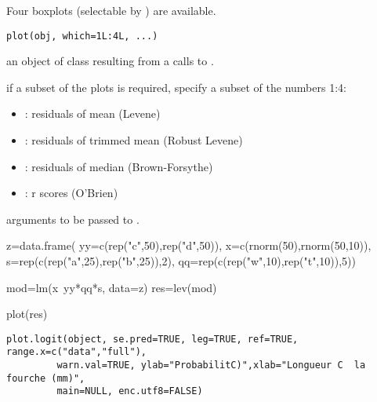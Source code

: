 \documentclass[a4paper]{book}
\begin{document}
\newpage
{}
%
\begin{Description}\relax
Four boxplots (selectable by ) are available.
\end{Description}
%
\begin{Usage}
\begin{verbatim}
plot(obj, which=1L:4L, ...)
\end{verbatim}
\end{Usage}
%
\begin{Arguments}
\begin{ldescription}
\item[\code{obj}] an object of class  resulting from a calls to .

\item[\code{which}] if a subset of the plots is required, specify a subset of the numbers 1:4:
\begin{itemize}

\item {} : residuals of mean (Levene)
\item {} : residuals of trimmed mean (Robust Levene)
\item {} : residuals of median (Brown-Forsythe)
\item {} : r scores (O'Brien)

\end{itemize}


\item[\code{...}] arguments to be passed to .

\end{ldescription}
\end{Arguments}
%
\begin{Examples}
\begin{ExampleCode}
z=data.frame( yy=c(rep("c",50),rep("d",50)),
        x=c(rnorm(50),rnorm(50,10)),
        s=rep(c(rep("a",25),rep("b",25)),2),
        qq=rep(c(rep("w",10),rep("t",10)),5))

mod=lm(x~yy*qq*s, data=z)
res=lev(mod)

plot(res)
\end{ExampleCode}
\end{Examples}
\newpage
{}
%
\begin{Usage}
\begin{verbatim}
plot.logit(object, se.pred=TRUE, leg=TRUE, ref=TRUE, range.x=c("data","full"), 
         warn.val=TRUE, ylab="ProbabilitC)",xlab="Longueur C  la fourche (mm)",
         main=NULL, enc.utf8=FALSE)
\end{verbatim}
\end{Usage}
\end{document}
